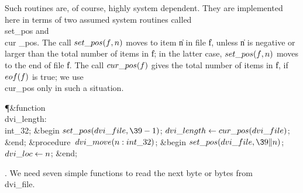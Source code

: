 Such routines are, of course, highly system dependent. They are implemented
here in terms of two assumed system routines called \\{set\_pos} and \\{cur%
\_pos}.
The call $\\{set\_pos}(\|f,\|n)$ moves to item \|n in file \|f, unless \|n is
negative or larger than the total number of items in \|f; in the latter
case, $\\{set\_pos}(\|f,\|n)$ moves to the end of file \|f.
The call $\\{cur\_pos}(\|f)$ gives the total number of items in \|f, if
$\\{eof}(\|f)$ is true; we use \\{cur\_pos} only in such a situation.

\Y\P\4\&{function}\1\  \\{dvi\_length}: \\{int\_32};\2\6
\&{begin} $\\{set\_pos}(\\{dvi\_file},\39-1)$;\5
$\\{dvi\_length}\K\\{cur\_pos}(\\{dvi\_file})$;\6
\&{end};\7
\4\&{procedure}\1\  $\\{dvi\_move}(\|n:\\{int\_32})$;\2\6
\&{begin} $\\{set\_pos}(\\{dvi\_file},\39\|n)$;\5
$\\{dvi\_loc}\K\|n$;\6
\&{end};\par
\fi

. We need seven simple functions to read the next byte or bytes
from \\{dvi\_file}.

